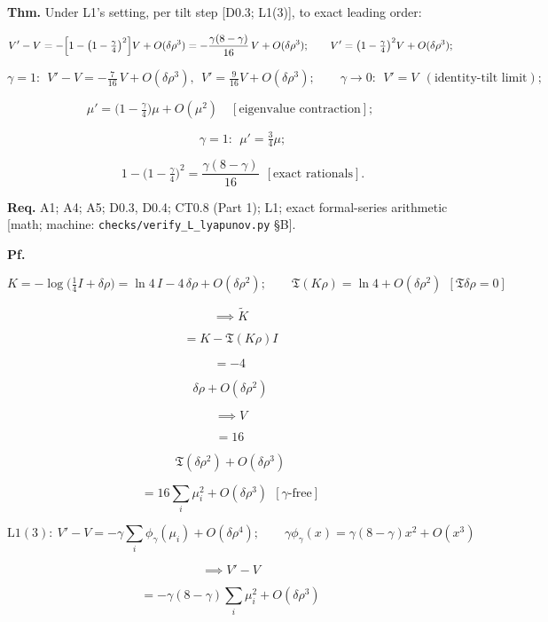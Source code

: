 \begin{theorem}\label{tag:L2}
\textbf{Thm.} Under L1's setting, per tilt step [D0.3; L1(3)], to exact leading order:

\[
V'-V=-\Bigl[1-\bigl(1-\tfrac\gamma4\bigr)^{2}\Bigr]V+O(\delta\rho^3)=-\frac{\gamma(8-\gamma)}{16}\,V+O(\delta\rho^3);\qquad
V'=\bigl(1-\tfrac\gamma4\bigr)^{2}V+O(\delta\rho^3);
\]

\[
\gamma=1:\ \ V'-V=-\tfrac7{16}\,V+O(\delta\rho^3),\ \ V'=\tfrac9{16}V+O(\delta\rho^3);\qquad
\gamma\to0:\ \ V'=V\ \ (\text{identity-tilt limit});
\]

\[
\mu'=\bigl(1-\tfrac\gamma4\bigr)\mu+O(\mu^2)\quad[\text{eigenvalue contraction}];
\]

\[
\qquad \gamma=1:\ \ \mu'=\tfrac34\mu;
\]

\[
\qquad 1-\bigl(1-\tfrac\gamma4\bigr)^2=\frac{\gamma(8-\gamma)}{16}\ \ [\text{exact rationals}].
\]

\textbf{Req.} A1; A4; A5; D0.3, D0.4; CT0.8 (Part 1); L1; exact formal-series arithmetic [math; machine: \texttt{checks/\allowbreak{}verify\_\allowbreak{}L\_\allowbreak{}lyapunov.py} §B].

\textbf{Pf.}

\[
K=-\log\bigl(\tfrac14I+\delta\rho\bigr)=\ln4\,I-4\,\delta\rho+O(\delta\rho^2);\qquad \mathfrak T(K\rho)=\ln4+O(\delta\rho^2)\ \ [\mathfrak T\delta\rho=0]
\]

\[
\implies\tilde K
\]

\[
= K-\mathfrak T(K\rho)I
\]

\[
= -4\,
\]

\[
\delta\rho+O(\delta\rho^2)
\]

\[
\implies V
\]

\[
= 16\,
\]

\[
\mathfrak T(\delta\rho^2)+O(\delta\rho^3)
\]

\[
= 16\textstyle\sum_i\mu_i^2+O(\delta\rho^3)\ \ [\gamma\text{-free}]
\]

\[
\mathrm{L1}(3):\ V'-V=-\gamma\textstyle\sum_i\phi_\gamma(\mu_i)+O(\delta\rho^4);\qquad \gamma\phi_\gamma(x)=\gamma(8-\gamma)x^2+O(x^3)
\]

\[
\implies V'-V
\]

\[
= -\gamma(8-\gamma)\textstyle\sum_i\mu_i^2+O(\delta\rho^3)
\]


\end{theorem}
